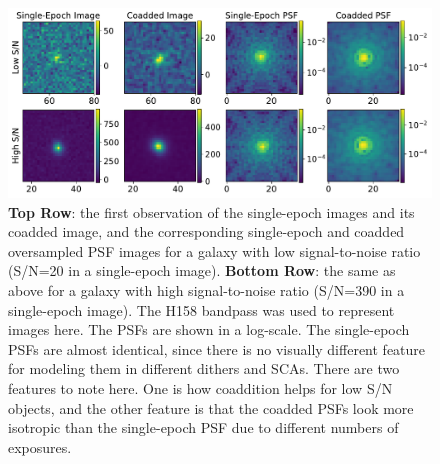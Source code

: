 \documentclass[fleqn,usenatbib]{mnras}
\begin{document}
\begin{figure}
	\includegraphics[width=\textwidth]{lowsnr_highsnr_galaxies_v2.pdf}
    \caption{\textbf{Top Row}: the first observation of the single-epoch images and its coadded image, and the corresponding single-epoch and coadded oversampled PSF images for a galaxy with low signal-to-noise ratio (S/N=20 in a single-epoch image). \textbf{Bottom Row}: the same as above for a galaxy with high signal-to-noise ratio (S/N=390 in a single-epoch image). The H158 bandpass was used to represent images here. The PSFs are shown in a log-scale. The single-epoch PSFs are almost identical, since there is no visually different feature for modeling them in different dithers and SCAs. There are two features to note here. One is how coaddition helps for low S/N objects, and the other feature is that the coadded PSFs look more isotropic than the single-epoch PSF due to different numbers of exposures.}
    \label{fig:singlecoadd}
\end{figure}
\end{document}
